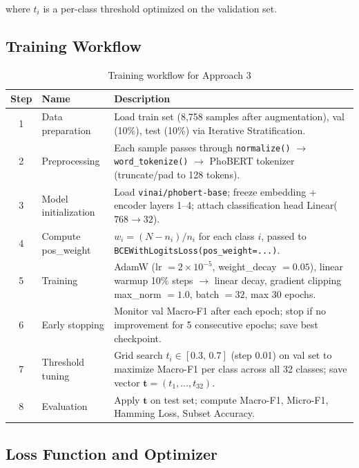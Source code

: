 \documentclass[12pt, a4paper]{report}
\begin{document}
where $t_i$ is a per-class threshold optimized on the validation set.

\subsection{Training Workflow}
\label{subsec:approach3_workflow}

\begin{table}[H]
\centering
\caption{Training workflow for Approach 3}
\label{tab:training_workflow}
\begin{tabularx}{\linewidth}{clX}
\toprule
\textbf{Step} & \textbf{Name} & \textbf{Description} \\
\midrule
1 & Data preparation
  & Load train set (8,758 samples after augmentation),
    val (10\%), test (10\%) via Iterative Stratification. \\
2 & Preprocessing
  & Each sample passes through \texttt{normalize()} $\rightarrow$
    \texttt{word\_tokenize()} $\rightarrow$ PhoBERT tokenizer
    (truncate/pad to 128 tokens). \\
3 & Model initialization
  & Load \texttt{vinai/phobert-base};
    freeze embedding + encoder layers 1--4;
    attach classification head Linear($768 \rightarrow 32$). \\
4 & Compute pos\_weight
  & $w_i = (N - n_i) / n_i$ for each class $i$,
    passed to \texttt{BCEWithLogitsLoss(pos\_weight=...)}. \\
5 & Training
  & AdamW (lr $= 2\!\times\!10^{-5}$, weight\_decay $= 0.05$),
    linear warmup 10\% steps $\rightarrow$ linear decay,
    gradient clipping max\_norm $= 1.0$,
    batch $= 32$, max 30 epochs. \\
6 & Early stopping
  & Monitor val Macro-F1 after each epoch;
    stop if no improvement for 5 consecutive epochs;
    save best checkpoint. \\
7 & Threshold tuning
  & Grid search $t_i \in [0.3,\,0.7]$ (step 0.01) on val set
    to maximize Macro-F1 per class across all 32 classes;
    save vector $\mathbf{t} = (t_1,\ldots,t_{32})$. \\
8 & Evaluation
  & Apply $\mathbf{t}$ on test set;
    compute Macro-F1, Micro-F1, Hamming Loss, Subset Accuracy. \\
\bottomrule
\end{tabularx}
\end{table}

\subsection{Loss Function and Optimizer}
\label{subsec:approach3_loss}
\end{document}

